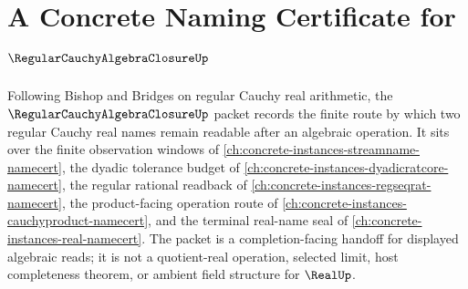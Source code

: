 \chapter{A Concrete Naming Certificate for $\RegularCauchyAlgebraClosureUp$}
\label{ch:concrete-instances-regular-cauchy-algebra-closure-namecert}

Following Bishop and Bridges on regular Cauchy real arithmetic, the $\RegularCauchyAlgebraClosureUp$ packet records the finite route by which two regular Cauchy real names remain readable after an algebraic operation. It sits over the finite observation windows of \autoref{ch:concrete-instances-streamname-namecert}, the dyadic tolerance budget of \autoref{ch:concrete-instances-dyadicratcore-namecert}, the regular rational readback of \autoref{ch:concrete-instances-regseqrat-namecert}, the product-facing operation route of \autoref{ch:concrete-instances-cauchyproduct-namecert}, and the terminal real-name seal of \autoref{ch:concrete-instances-real-namecert}. The packet is a completion-facing handoff for displayed algebraic reads; it is not a quotient-real operation, selected limit, host completeness theorem, or ambient field structure for $\RealUp$.

